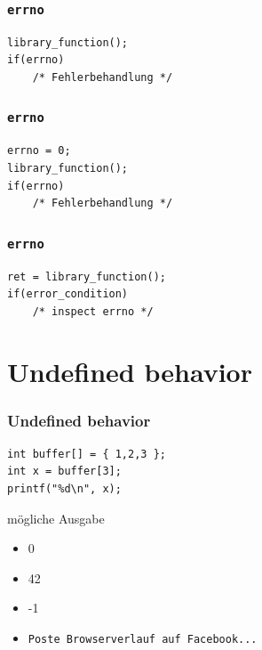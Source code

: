 \documentclass[12pt,compress]{beamer}
\begin{document}
\begin{frame}[fragile]
\frametitle{\texttt{errno}}

\begin{lstlisting}
library_function();
if(errno)
    /* Fehlerbehandlung */
\end{lstlisting}
\end{frame}

\begin{frame}[fragile]
\frametitle{\texttt{errno}}

\begin{lstlisting}
errno = 0;
library_function();
if(errno)
    /* Fehlerbehandlung */
\end{lstlisting}
\end{frame}

\begin{frame}[fragile]
\frametitle{\texttt{errno}}

\begin{lstlisting}
ret = library_function();
if(error_condition)
    /* inspect errno */
\end{lstlisting}
\end{frame}

\section{Undefined behavior}


\begin{frame}[fragile]
\frametitle{Undefined behavior}

\begin{lstlisting}
int buffer[] = { 1,2,3 };
int x = buffer[3];
printf("%d\n", x);
\end{lstlisting}

\vfill

mögliche Ausgabe
\begin{itemize}
\item 0
\item 42
\item -1
\item \texttt{Poste Browserverlauf auf Facebook...}
\end{itemize}
\end{frame}
\end{document}
